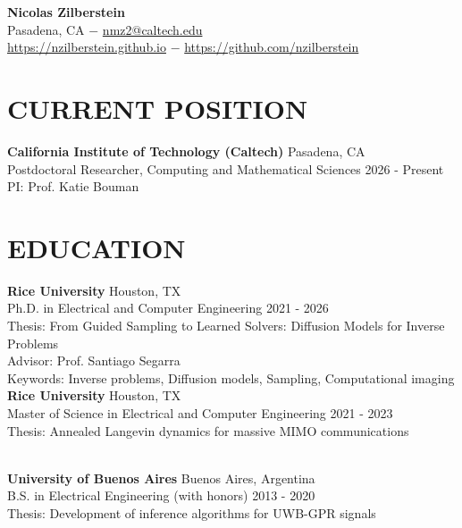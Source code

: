 \documentclass[a4paper,9pt]{extarticle}
\begin{document}


\pagestyle{fancy}
\renewcommand{\headrulewidth}{0pt}
\fancyhead{}
\fancyhead[L]{}
\fancyhead[R]{}
\thispagestyle{empty} %

\begin{flushleft}
\centering\textbf{\LARGE Nicolas Zilberstein}\\[2pt] %
Pasadena, CA $-$ \href{mailto:nmz2@caltech.edu}{nmz2@caltech.edu} \\ \url{https://nzilberstein.github.io} $-$ \url{https://github.com/nzilberstein}
\end{flushleft}

\section*{CURRENT POSITION}
\noindent
\textbf{California Institute of Technology (Caltech)} \hfill Pasadena, CA\\ %
Postdoctoral Researcher, Computing and Mathematical Sciences \hfill 2026 - Present\\ %
PI: Prof. Katie Bouman\\

\section*{EDUCATION}
\noindent
\textbf{Rice University} \hfill Houston, TX\\ %
Ph.D. in Electrical and Computer Engineering \hfill 2021 - 2026\\ %
Thesis: From Guided Sampling to Learned Solvers: Diffusion Models for Inverse Problems\\
Advisor: Prof. Santiago Segarra\\
Keywords: Inverse problems, Diffusion models, Sampling, Computational imaging\\

\noindent
\textbf{Rice University} \hfill Houston, TX\\ %
Master of Science in Electrical and Computer Engineering \hfill 2021 - 2023 \\ %
Thesis: Annealed Langevin dynamics for massive MIMO communications%

\noindent\\
\textbf{University of Buenos Aires} \hfill Buenos Aires, Argentina\\ %
B.S. in Electrical Engineering (with honors) \hfill 2013 - 2020\\%
Thesis: Development of inference algorithms for UWB-GPR signals
\end{document}
